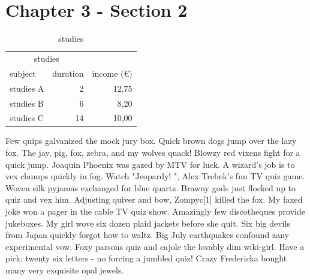 \section{Chapter 3 - Section 2}
\label{Chapter_3_-_Section_2}
%
\begin{table}[b]
\centering
\begin{tabular}{lrr}
\toprule
\multicolumn{2}{c}{studies}\\ \cmidrule{1-2}
subject & duration & income (\euro{})\\
\midrule
studies A & 2 & 12,75 \\ \addlinespace
studies B & 6 & 8,20 \\ \addlinespace
studies C & 14 & 10,00\\
\bottomrule
\end{tabular}
\caption{studies}
\label{table:studies}
\end{table}
%
Few quips galvanized the mock jury box. Quick brown dogs jump over the lazy fox. The jay, pig, fox, zebra, and my wolves quack! Blowzy red vixens fight for a quick jump. Joaquin Phoenix was gazed by MTV for luck. A wizard’s job is to vex chumps quickly in fog. Watch "Jeopardy! ", Alex Trebek's fun TV quiz game. Woven silk pyjamas exchanged for blue quartz. Brawny gods just flocked up to quiz and vex him. Adjusting quiver and bow, Zompyc[1] killed the fox. My faxed joke won a pager in the cable TV quiz show. Amazingly few discotheques provide jukeboxes. My girl wove six dozen plaid jackets before she quit. Six big devils from Japan quickly forgot how to waltz. Big July earthquakes confound zany experimental vow. Foxy parsons quiz and cajole the lovably dim wiki-girl. Have a pick: twenty six letters - no forcing a jumbled quiz! Crazy Fredericka bought many very exquisite opal jewels.

